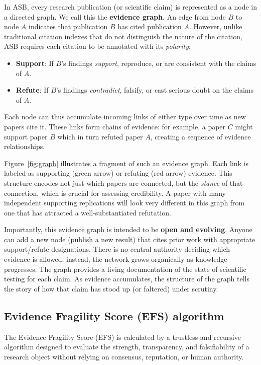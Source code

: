 \documentclass{article}
\begin{document}
In ASB, every research publication (or scientific claim) is represented as a node in a directed graph. We call this the \textbf{evidence graph}. An edge from node $B$ to node $A$ indicates that publication $B$ has cited publication $A$. However, unlike traditional citation indexes that do not distinguish the nature of the citation, ASB requires each citation to be annotated with its \emph{polarity}:
\begin{itemize}
	\item \textbf{Support}: If $B$'s findings \textit{support}, reproduce, or are consistent with the claims of $A$.
	\item \textbf{Refute}: If $B$'s findings \textit{contradict}, falsify, or cast serious doubt on the claims of $A$.
\end{itemize}
Each node can thus accumulate incoming links of either type over time as new papers cite it. These links form chains of evidence: for example, a paper $C$ might support paper $B$ which in turn refuted paper $A$, creating a sequence of evidence relationships.

Figure~\ref{fig:graph} illustrates a fragment of such an evidence graph. Each link is labeled as supporting (green arrow) or refuting (red arrow) evidence. This structure encodes not just which papers are connected, but the \emph{stance} of that connection, which is crucial for assessing credibility. A paper with many independent supporting replications will look very different in this graph from one that has attracted a well-substantiated refutation.

Importantly, this evidence graph is intended to be \textbf{open and evolving}. Anyone can add a new node (publish a new result) that cites prior work with appropriate support/refute designations. There is no central authority deciding which evidence is allowed; instead, the network grows organically as knowledge progresses. The graph provides a living documentation of the state of scientific testing for each claim. As evidence accumulates, the structure of the graph tells the story of how that claim has stood up (or faltered) under scrutiny.



\subsection{Evidence Fragility Score (EFS) algorithm}
The Evidence Fragility Score (EFS) is calculated by a trustless and recursive algorithm designed to evaluate the strength, transparency, and falsifiability of a research object without relying on consensus, reputation, or human authority.
\end{document}
